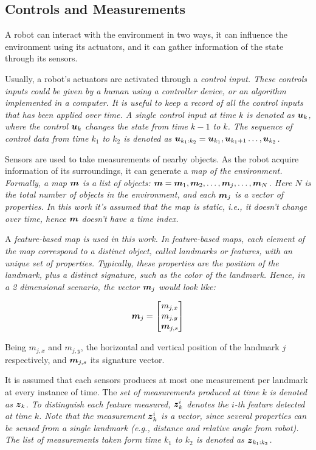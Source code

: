 \subsection{Controls and Measurements}

A robot can interact with the environment in two ways, it can influence the environment using its actuators, and it can gather information of the state through its sensors. 

Usually, a robot's actuators are activated through a \it{control input}. These controls inputs could be given by a human using a controller device, or an algorithm implemented in a computer. It is useful to keep a record of all the control inputs that has been applied over time. A single control input at time $k$ is denoted as $\boldsymbol{u}_k$, where the control $\boldsymbol{u}_k$ changes the state from  time $k-1$ to $k$. The sequence of control data from time $k_1$ to $k_2$ is denoted as $\boldsymbol{u}_{k_1:k_2}= \boldsymbol{u}_{k_1},\boldsymbol{u}_{k_1+1}\dots,\boldsymbol{u}_{k_2}$.

Sensors are used to take measurements of nearby objects. As the robot acquire information of its surroundings, it can generate a \it{map} of the environment. Formally, a map $\boldsymbol{m}$ is a list of objects: $\boldsymbol{m}=\boldsymbol{m}_1,\boldsymbol{m}_2,\dots,\boldsymbol{m}_j,\dots,\boldsymbol{m}_N$. Here $N$ is the total number of objects in the environment, and each $\boldsymbol{m}_j$ is a vector of properties. In this work it's assumed that the map is static, i.e., it doesn't change over time, hence $\boldsymbol{m}$ doesn't have a time index.

A \it{feature-based} map is used in this work. In feature-based maps, each element of the map correspond to a distinct object, called \it{landmarks} or \it{features}, with an unique set of properties. Typically, these properties are the position of the landmark, plus a distinct signature, such as the color of the landmark. Hence, in a 2 dimensional scenario, the vector $\boldsymbol{m}_j$ would look like:

\begin{equation}
\boldsymbol{m}_j = \begin{bmatrix}
m_{j,x}\\
m_{j,y}\\
\boldsymbol{m}_{j,s}
\end{bmatrix}
\end{equation} 

Being $m_{j,x}$ and $m_{j,y}$, the horizontal and vertical position of the landmark $j$ respectively, and $\boldsymbol{m}_{j,s}$ its signature vector.

It is assumed that each sensors produces at most one measurement per landmark at every instance of time. The \it{set of measurements} produced at time $k$ is denoted as $\boldsymbol{z}_k$. To distinguish each feature measured, $\boldsymbol{z}_k^i$ denotes the $i$-th feature detected at time $k$. Note that the measurement $\boldsymbol{z}_k^i$ is a vector, since several properties can be sensed from a single landmark (e.g., distance and relative angle from robot). The list of measurements taken form time $k_1$ to $k_2$ is denoted as $\boldsymbol{z}_{k_1:k_2}$.

